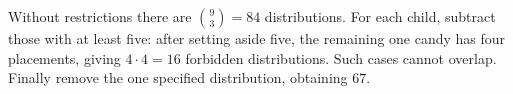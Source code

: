 Without restrictions there are $\binom93=84$ distributions. For each child, subtract those with at least five: after setting aside five, the remaining one candy has four placements, giving $4\cdot4=16$ forbidden distributions. Such cases cannot overlap. Finally remove the one specified distribution, obtaining $\boxed{67}$.
